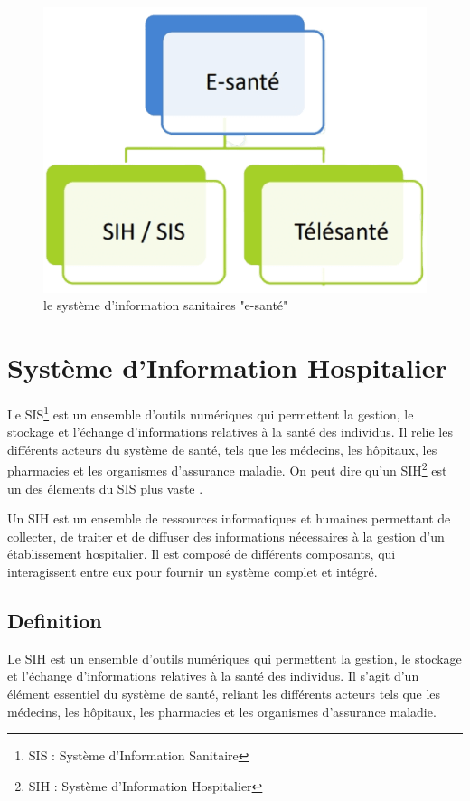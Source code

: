 \documentclass[12pt]{rapportINPTCLOUD}
\begin{document}
	\begin{figure}[H]
		\centering
		\includegraphics[width=1\linewidth]{img/m-sih-sis.png}
		\caption{le système d'information sanitaires "e-santé"}
		\label{fig:e-santé}
	\end{figure}
	
	\chapter{\textcolor{chapitrecolor}{Système d'Information Hospitalier}}
	
	Le SIS\footnote{SIS : Système d'Information Sanitaire} est un ensemble d'outils numériques qui permettent la gestion, le stockage et l'échange d'informations relatives à la santé des individus. Il relie les différents acteurs du système de santé, tels que les médecins, les hôpitaux, les pharmacies et les organismes d'assurance maladie.
	On peut dire qu’un SIH\footnote{SIH : Système d'Information Hospitalier} est un des élements du SIS plus vaste .
	
	Un SIH est un ensemble de ressources informatiques et humaines permettant de collecter, de traiter et de diffuser des informations nécessaires à la gestion d'un établissement hospitalier. Il est composé de différents composants, qui interagissent entre eux pour fournir un système complet et intégré.
	\section{Definition}
	
	Le SIH est un ensemble d'outils numériques qui permettent la gestion, le stockage et l'échange d'informations relatives à la santé des individus. Il s'agit d'un élément essentiel du système de santé, reliant les différents acteurs tels que les médecins, les hôpitaux, les pharmacies et les organismes d'assurance maladie.	
\end{document}
